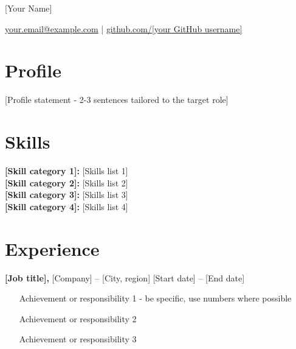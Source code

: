\documentclass[11pt]{article}       %
\begin{document}
\centerline{\Huge [Your Name]}

\vspace{5pt}

\centerline{\href{mailto:your.email@example.com}{your.email@example.com} | %
\href{https://github.com/[your GitHub username]}{github.com/[your GitHub username]}}

\vspace{-10pt}

\section*{Profile}
[Profile statement - 2-3 sentences tailored to the target role]

\vspace{-6.5pt}

\section*{Skills}
\textbf{[Skill category 1]:} [Skills list 1] \\
\textbf{[Skill category 2]:} [Skills list 2] \\
\textbf{[Skill category 3]:} [Skills list 3] \\
\textbf{[Skill category 4]:} [Skills list 4]

\vspace{-6.5pt}

\section*{Experience}

\textbf{[Job title],} {[Company]} -- [City, region] \hfill [Start date] -- [End date] \\
\vspace{-9pt}
\begin{itemize}
  \item [Achievement or responsibility 1 - be specific, use numbers where possible]
  \item [Achievement or responsibility 2]
  \item [Achievement or responsibility 3]
\end{itemize}


\vspace{-18.5pt}
\end{document}
